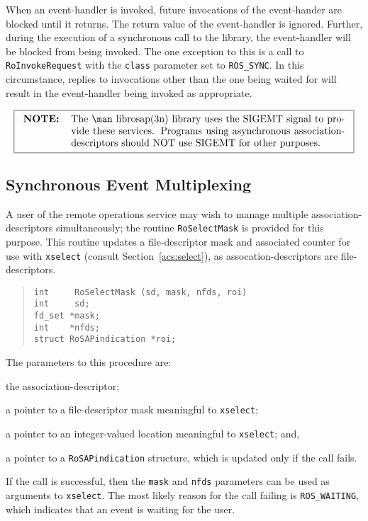 When an event-handler is invoked,
future invocations of the event-hander are blocked until it returns.
The return value of the event-handler is ignored.
Further,
during the execution of a synchronous call to the library,
the event-handler will be blocked from being invoked.
The one exception to this is a call to \verb"RoInvokeRequest" with the
\verb"class" parameter set to \verb"ROS_SYNC".
In this circumstance,
replies to invocations other than the one being waited for will result in the
event-handler being invoked as appropriate.

\[\fbox{\begin{tabular}{lp{0.8\textwidth}}
\bf NOTE:&	The \man librosap(3n) library uses the SIGEMT signal to
		provide these services.
		Programs using asynchronous association-descriptors should NOT
		use SIGEMT for other purposes.
\end{tabular}}\]

\subsection     {Synchronous Event Multiplexing}
A user of the remote operations service may wish to manage multiple
association-descriptors simultaneously;
the routine \verb"RoSelectMask" is provided for this purpose.
This routine updates a file-descriptor mask and associated counter for use
with \verb"xselect" (consult Section~\ref{acs:select}),
as assocation-descriptors are file-descriptors.
\begin{quote}\small\begin{verbatim}
int     RoSelectMask (sd, mask, nfds, roi)
int     sd;
fd_set *mask;
int    *nfds;
struct RoSAPindication *roi;
\end{verbatim}\end{quote}
The parameters to this procedure are:
\begin{describe}
\item[\verb"sd":] the association-descriptor;

\item[\verb"mask":] a pointer to a file-descriptor mask meaningful to
\verb"xselect";

\item[\verb"nfds":] a pointer to an integer-valued location meaningful to
\verb"xselect";
and,

\item[\verb"roi":] a pointer to a \verb"RoSAPindication" structure, which is
updated only if the call fails.
\end{describe}
If the call is successful, then the \verb"mask" and \verb"nfds" parameters can
be used as arguments to \verb"xselect".
The most likely reason for the call failing is \verb"ROS_WAITING",
which indicates that an event is waiting for the user.

